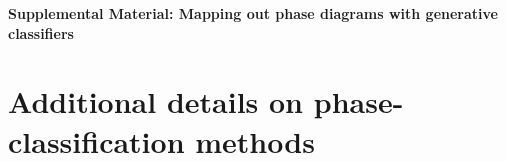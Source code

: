 \setcounter{equation}{0}
\setcounter{figure}{0}
\setcounter{table}{0}
\setcounter{page}{1}
\makeatletter
\renewcommand{\thesection}{S\arabic{section}}
\renewcommand{\theequation}{S\arabic{equation}}
\renewcommand{\thefigure}{S\arabic{figure}}

\begin{widetext}
\begin{center}
\textbf{\large Supplemental Material: Mapping out phase diagrams with generative classifiers}
\end{center}
\end{widetext}

\section{Additional details on phase-classification methods}
